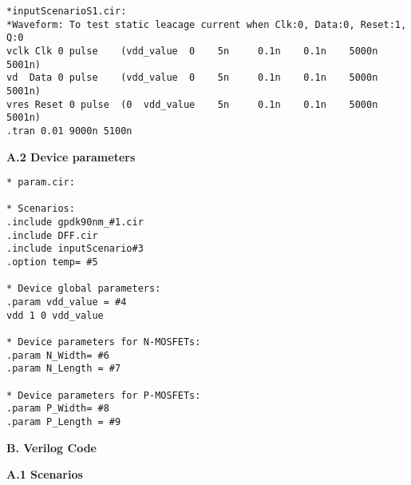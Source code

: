 \begin{lstlisting}
*inputScenarioS1.cir:
*Waveform: To test static leacage current when Clk:0, Data:0, Reset:1, Q:0
vclk Clk 0 pulse    (vdd_value  0    5n     0.1n    0.1n    5000n     5001n)     
vd  Data 0 pulse    (vdd_value  0    5n     0.1n    0.1n    5000n     5001n)   
vres Reset 0 pulse  (0  vdd_value    5n     0.1n    0.1n    5000n     5001n)   
.tran 0.01 9000n 5100n
\end{lstlisting}

\textbf{A.2 Device parameters}

\begin{lstlisting}
* param.cir:

* Scenarios:
.include gpdk90nm_#1.cir 
.include DFF.cir
.include inputScenario#3
.option temp= #5

* Device global parameters:
.param vdd_value = #4
vdd 1 0 vdd_value

* Device parameters for N-MOSFETs:
.param N_Width= #6
.param N_Length = #7

* Device parameters for P-MOSFETs:
.param P_Width= #8
.param P_Length = #9
\end{lstlisting}


\textbf{B. Verilog Code}

\textbf{A.1 Scenarios}

